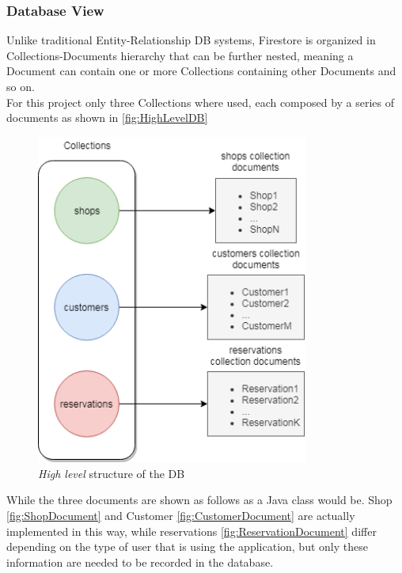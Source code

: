 \subsubsection{Database View}
Unlike traditional Entity-Relationship DB systems, Firestore is organized in Collections-Documents hierarchy that can be further nested, meaning a Document can contain one or more Collections containing other Documents and so on.\\
For this project only three Collections where used, each composed by a series of documents as shown in \autoref{fig:HighLevelDB}
\begin{figure}[H]
	\includegraphics[width = 0.8\textwidth, keepaspectratio = true]{Img/HighLevelDB}
	\caption{\emph{High level} structure of the DB}
	\label{fig:HighLevelDB}
\end{figure}
\clearpage
\noindent While the three documents are shown as follows as a Java class would be. Shop \autoref{fig:ShopDocument} and Customer \autoref{fig:CustomerDocument} are actually implemented in this way, while reservations \autoref{fig:ReservationDocument} differ depending on the type of user that is using the application, but only these information are needed to be recorded in the database.
